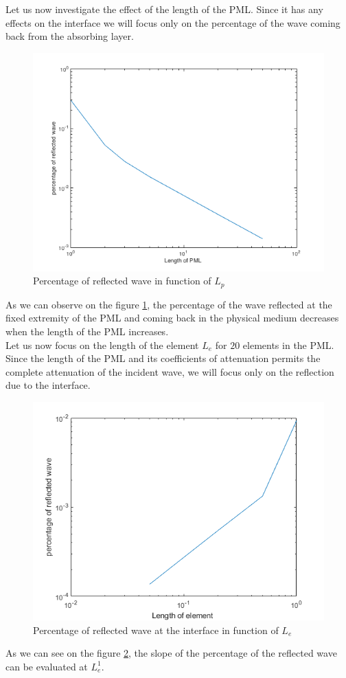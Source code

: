Let us now investigate the effect of the length of the PML. Since it has any effects on the interface we will focus only on the percentage of the wave coming back from the absorbing layer. 
\begin{figure}[H]
    \centering
    \includegraphics[scale=0.5]{images/bouncing_Lp.png}
    \caption{Percentage of reflected wave in function of $L_p$}
    \label{fig:refl_Lp}
\end{figure}
As we can observe on the figure \ref{fig:refl_Lp}, the percentage of the wave reflected at the fixed extremity of the PML and coming back in the physical medium decreases when the length of the PML increases. \\
Let us now focus on the length of the element $L_e$ for $20$ elements in the PML. Since the length of the PML and its coefficients of attenuation permits the complete attenuation of the incident wave, we will focus only on the reflection due to the interface.
\begin{figure}[H]
    \centering
    \includegraphics[scale=0.5]{images/reflected_Le.png}
    \caption{Percentage of reflected wave at the interface in function of $L_e$}
    \label{fig:refl_Le}
\end{figure}
As we can see on the figure \ref{fig:refl_Le}, the slope of the percentage of the reflected wave can be evaluated at $L_e^1$.









